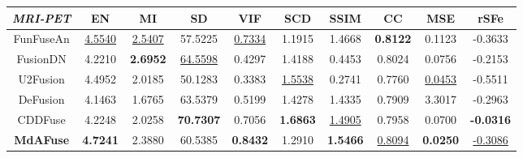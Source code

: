 \begin{table}[htb]
\begin{tabular}{cccccccccc}
\textit{MRI-PET}            & \textbf{EN}     & \textbf{MI}     & \textbf{SD}      & \textbf{VIF}   & \textbf{SCD}    & \textbf{SSIM}   & \textbf{CC}     & \textbf{MSE}    & \textbf{rSFe}    \\ \hline
FunFuseAn                  & \underline{ 4.5540}    & \underline{ 2.5407}    & 57.5225          & \underline{ 0.7334}    & 1.1915          & 1.4668          & \textbf{0.8122} & 0.1123          & -0.3633          \\
FusionDN                  & 4.2210          & \textbf{2.6952} & \underline{ 64.5598}    & 0.4297          & 1.4188          & 0.4453          & 0.8024          & 0.0756          & -0.2153          \\
U2Fusion                        & 4.4952          & 2.0185          & 50.1283          & 0.3383          & \underline{ 1.5538}    & 0.2741          & 0.7760          & \underline{ 0.0453}    & -0.5511          \\
DeFusion                        & 4.1463          & 1.6765          & 63.5379          & 0.5199          & 1.4278          & 1.4335          & 0.7909          & 3.3017          & -0.2963          \\
CDDFuse                   & 4.2248          & 2.0258          & \textbf{70.7307} & 0.7056          & \textbf{1.6863} & \underline{ 1.4905}    & 0.7958          & 0.0700          & \textbf{-0.0316} \\
\textbf{MdAFuse}                    & \textbf{4.7241} & 2.3880          & 60.5385          & \textbf{0.8432} & 1.2910          & \textbf{1.5466} & \underline{ 0.8094}    & \textbf{0.0250} & \underline{ -0.3086}    \\ \hline


\end{tabular}
\end{table}
